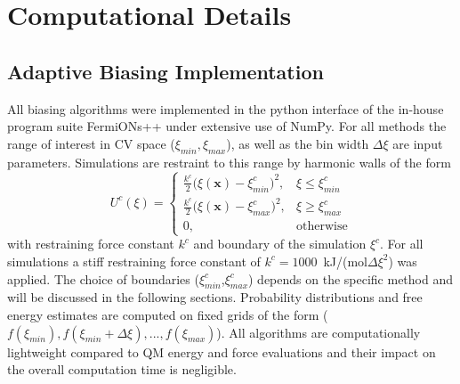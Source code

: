 \chapter{Computational Details}
\label{cha:comp}

\section{Adaptive Biasing Implementation}
\label{sec:comp ABM}
All biasing algorithms were implemented in the python interface of the in-house program suite FermiONs++ under extensive use of NumPy\autocite{harris2020array}.
For all methods the range of interest in CV space ($\xi_{min},\xi_{max}$), as well as the bin width $\Delta\xi$ are input parameters.
Simulations are restraint to this range by harmonic walls of the form
\begin{equation}
U^c(\xi) =\left\{\begin{array}{ll} \frac{k^c}{2}\bigl(\xi(\textbf{x}) - \xi^c_{min} \bigr)^2, & \xi \leq \xi^c_{min} \\
                                   \frac{k^c}{2}\bigl(\xi(\textbf{x}) - \xi^c_{max} \bigr)^2, & \xi \geq \xi^c_{max} \\
                                    0, & \text{otherwise}
          \end{array}\right.
\label{eq:harmonic wall}
\end{equation}
with restraining force constant $k^c$ and boundary of the simulation $\xi^c$.
For all simulations a stiff restraining force constant of $k^c=1000$~kJ/(mol$\Delta\xi^2$) was applied. The choice of boundaries ($\xi^c_{min}$,$\xi^c_{max}$) depends on the specific method and will be discussed in the following sections.
Probability distributions and free energy estimates are computed on fixed grids of the form ($f(\xi_{min}),f(\xi_{min}+\Delta\xi),...,f(\xi_{max})$).
All algorithms are computationally lightweight compared to QM energy and force evaluations and their impact on the overall computation time is negligible.

